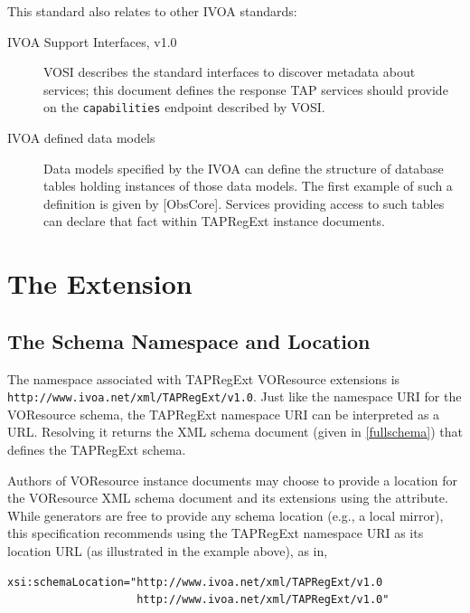 \documentclass{ivoa}
\begin{document}
This standard also relates to other IVOA standards:


\begin{description}
\item[IVOA Support Interfaces, v1.0 \citep{std:VOSI}] VOSI describes the standard interfaces to discover metadata about
services; this document defines the response TAP services should
provide on the \texttt{capabilities} endpoint described by VOSI.
\item[IVOA defined data models]Data models specified by the IVOA can define the structure of
database tables holding instances of those data models.
The first example of such a definition is given by
\citep{std:OBSCORE}{[ObsCore]}.  Services providing
access to such tables
can declare that fact within TAPRegExt instance documents.

\end{description}


\section{The Extension}

\label{taextension}

\subsection{The Schema Namespace and Location}

\label{nsloc}

The namespace associated with TAPRegExt VOResource extensions is
\texttt{http://www.ivoa.net/xml/TAPRegExt/v1.0}.  
Just like the namespace URI for the VOResource schema, the
TAPRegExt namespace URI can be interpreted as a URL.  Resolving it
returns the XML schema document (given in \ref{fullschema})
that defines the TAPRegExt schema.

Authors of VOResource instance documents may choose to
provide a location for the VOResource XML schema document and its
extensions using the
 attribute.  
While generators are
free to provide any schema location (e.g., a local mirror), this specification
recommends using the TAPRegExt namespace URI as its location URL
(as illustrated in the example above), as in,


\begin{verbatim}
xsi:schemaLocation="http://www.ivoa.net/xml/TAPRegExt/v1.0
                    http://www.ivoa.net/xml/TAPRegExt/v1.0"
\end{verbatim}
\end{document}
